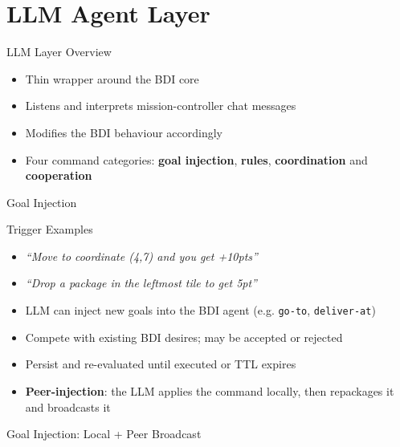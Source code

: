 \section{LLM Agent Layer}

\begin{frame}{LLM Layer Overview}
  \begin{itemize}
    \item Thin wrapper around the BDI core
    \item Listens and interprets mission-controller chat messages
    \item Modifies the BDI behaviour accordingly
    \item Four command categories: \textbf{goal injection}, \textbf{rules}, \textbf{coordination} and \textbf{cooperation}
  \end{itemize}
\end{frame}

\begin{frame}{Goal Injection}
  \begin{exampleblock}{Trigger Examples}
    \begin{itemize}
      \item \textit{``Move to coordinate (4,7) and you get +10pts''}
      \item \textit{``Drop a package in the leftmost tile to get 5pt''}
    \end{itemize}
  \end{exampleblock}
  
  \vspace{1em}
  
  \begin{itemize}
    \item LLM can inject new goals into the BDI agent (e.g. \texttt{go-to}, \texttt{deliver-at})
    \item Compete with existing BDI desires; may be accepted or rejected
    \item Persist and re-evaluated until executed or TTL expires
    \item \textbf{Peer-injection}: the LLM applies the command locally, then repackages it and broadcasts it
  \end{itemize}
\end{frame}

\begin{frame}{Goal Injection: Local + Peer Broadcast}
  \centering
  \resizebox{0.92\textwidth}{!}{}
\end{frame}

